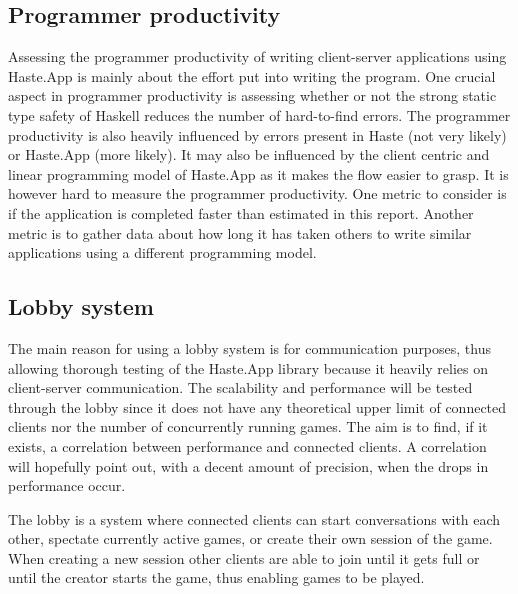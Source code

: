\documentclass[a4paper]{article}
\begin{document}
\subsection{Programmer productivity}
Assessing the programmer productivity of writing client-server applications using Haste.App
is mainly about the effort put into writing the program. One crucial aspect in programmer productivity is assessing whether or not the strong static type safety of Haskell reduces the number of hard-to-find errors. The programmer productivity is also heavily influenced by errors present in Haste (not very likely) or Haste.App (more likely). It may also be influenced by the client centric and linear programming model of Haste.App as it makes the flow easier to grasp. It is however hard to measure the programmer productivity. One metric to consider is if the application is completed faster than estimated in this report. Another metric is to gather data about how long it has taken others to write similar applications using a different programming model. 

\subsection{Lobby system}
The main reason for using a lobby system is for communication purposes, thus allowing thorough testing of the Haste.App library because it heavily relies on client-server communication. The scalability and performance will be tested through the lobby since it does not have any theoretical upper limit of connected clients nor the number of concurrently running games. The aim is to find, if it exists, a correlation between performance and connected clients. A correlation will hopefully point out, with a decent amount of precision, when the drops in performance occur.

The lobby is a system where connected clients can start conversations with each other, spectate currently active games, or create their own session of the game. When creating a new session other clients are able to join until it gets full or until the creator starts the game, thus enabling games to be played. 
\end{document}
